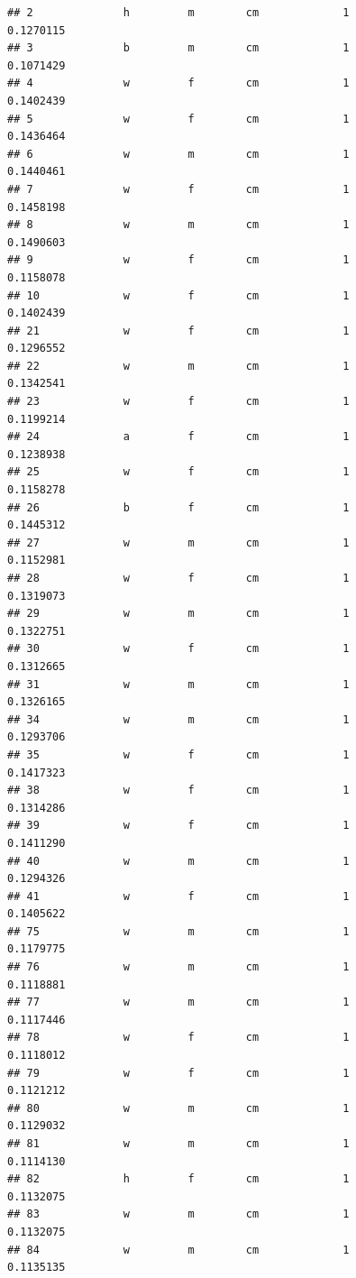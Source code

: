 \documentclass[]{article}
\begin{document}
\begin{verbatim}
## 2              h         m        cm             1          0.1270115
## 3              b         m        cm             1          0.1071429
## 4              w         f        cm             1          0.1402439
## 5              w         f        cm             1          0.1436464
## 6              w         m        cm             1          0.1440461
## 7              w         f        cm             1          0.1458198
## 8              w         m        cm             1          0.1490603
## 9              w         f        cm             1          0.1158078
## 10             w         f        cm             1          0.1402439
## 21             w         f        cm             1          0.1296552
## 22             w         m        cm             1          0.1342541
## 23             w         f        cm             1          0.1199214
## 24             a         f        cm             1          0.1238938
## 25             w         f        cm             1          0.1158278
## 26             b         f        cm             1          0.1445312
## 27             w         m        cm             1          0.1152981
## 28             w         f        cm             1          0.1319073
## 29             w         m        cm             1          0.1322751
## 30             w         f        cm             1          0.1312665
## 31             w         m        cm             1          0.1326165
## 34             w         m        cm             1          0.1293706
## 35             w         f        cm             1          0.1417323
## 38             w         f        cm             1          0.1314286
## 39             w         f        cm             1          0.1411290
## 40             w         m        cm             1          0.1294326
## 41             w         f        cm             1          0.1405622
## 75             w         m        cm             1          0.1179775
## 76             w         m        cm             1          0.1118881
## 77             w         m        cm             1          0.1117446
## 78             w         f        cm             1          0.1118012
## 79             w         f        cm             1          0.1121212
## 80             w         m        cm             1          0.1129032
## 81             w         m        cm             1          0.1114130
## 82             h         f        cm             1          0.1132075
## 83             w         m        cm             1          0.1132075
## 84             w         m        cm             1          0.1135135

\end{verbatim}
\end{document}
